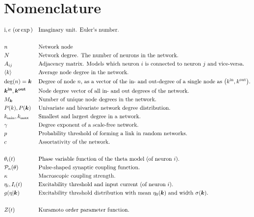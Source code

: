 \newpage
\section{Nomenclature}
\vspace{-.5cm}
\begin{alignat*}{2}
& \ic, e \text{ (or} \exp\text{)} &&\text{Imaginary unit. Euler's number.}\\ \\
& n&&\text{Network node}\\
& N &&\text{Network degree. The number of neurons in the network.}\\
& A_{ij} &&\text{Adjacency matrix. Models which neuron $i$ is connected to neuron $j$ and vice-versa.}\\
& \kmean &&\text{Average node degree in the network.}\\
& \degree(n) = \k &&\text{Degree of node $n$, as a vector of the in- and out-degree of a single node as $\left(\kin, \kout \right)$.}\\
& \kinb, \koutb && \text{Node degree vector of all in- and out degrees of the network.} \\
& M_{\k} &&\text{Number of unique node degrees in the network.}\\
& P(k), P(\k) &&\text{Univariate and bivariate network degree distribution.}\\
&\kmin, \kmax &&\text{Smallest and largest degree in a network.}\\ 
&\gamma &&\text{Degree exponent of a scale-free network.}\\ 
&p &&\text{Probability threshold of forming a link in random networks.}\\ 
&c &&\text{Assortativity of the network.}\\ \\
&\theta_i(t) &&\text{Phase variable function of the theta model (of neuron $i$).}\\
& \Pulse_n (\theta)&&\text{Pulse-shaped synaptic coupling function.}\\
&\kappa &&\text{Macroscopic coupling strength.}\\
&\eta_i, I_i(t) &&\text{Excitability threshold and input current (of neuron $i$).}\\
&g(\eta \rvert \k) \quad &&\text{Excitability threshold distribution with mean $\eta_0(\k)$ and width $\sigma(\k)$.}\\ \\
& Z(t) &&\text{Kuramoto order parameter function.}\\

\end{alignat*}
